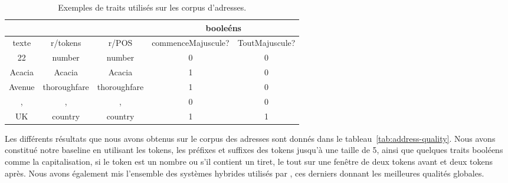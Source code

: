 \documentclass[PhD-Yoann-Dupont.tex]{subfiles}
\begin{document}
\begin{table}[ht!]
\begin{tabular}{|c|cccc|}
\cline{4-5}
\multicolumn{1}{c}{} & & & \multicolumn{2}{|c|}{booleéns} \\
\hline
texte  & r/tokens & r/POS & commenceMajuscule? & ToutMajuscule? \\
\hline
22     & number & number & 0 & 0 \\
Acacia & Acacia & Acacia & 1 & 0 \\
Avenue & thoroughfare & thoroughfare & 1 & 0 \\
,      & , & , & 0 & 0 \\
UK     & country & country & 1 & 1 \\
\hline
\end{tabular}
\caption{Exemples de traits utilisés sur les corpus d'adresses.}
\label{tab:address-feature-example}
\end{table}

Les différents résultats que nous avons obtenus sur le corpus des adresses sont donnés dans le tableau\ \ref{tab:address-quality}. Nous avons constitué notre baseline en utilisant les tokens, les préfixes et suffixes des tokens jusqu'à une taille de 5, ainsi que quelques traits booléens comme la capitalisation, si le token est un nombre ou s'il contient un tiret, le tout sur une fenêtre de deux tokens avant et deux tokens après. Nous avons également mis l'ensemble des systèmes hybrides utilisés par \cite{yu2007high}, ces derniers donnant les meilleures qualités globales.
\end{document}
